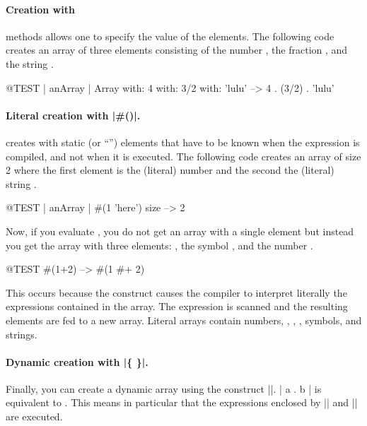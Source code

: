 \documentclass[a4paper,10pt,twoside]{book}
\begin{document}
\paragraph{Creation with }  methods allows one to specify the value of the elements.  
The following code creates an array of three elements consisting of the number , the fraction , and the string .

\begin{code}{@TEST | anArray |}
Array with: 4 with: 3/2 with: 'lulu' -->  {4 . (3/2) . 'lulu'}
\end{code}

\paragraph{Literal creation with \ct|\#()|.}
\ct{#()} creates  with static (or ``'') elements that have to be known when the expression is compiled, and not when it is executed.
The following code creates an array of size 2 where the first element is the (literal) number  and the second the (literal) string .


\begin{code}{@TEST | anArray |}
#(1 'here') size --> 2
\end{code}

Now, if you evaluate , you do not get an array with a single element  but instead you get the array  \ie with three elements: , the symbol \ct{#+}, and the number .

\begin{code}{@TEST}
#(1+2) -->  #(1 #+ 2)
\end{code}

\noindent
This occurs because the construct \ct{#()} causes the compiler to interpret literally the expressions contained in the array.
The expression is scanned and the resulting elements are fed to a new array.
Literal arrays contain numbers, , , , symbols, and strings.

\paragraph{Dynamic creation with \ct|\{ \}|.}
Finally, you can create a dynamic array using the construct \ct|{}|.
\ct|{ a . b }| is equivalent to .
This means in particular that the expressions enclosed by \ct|{| and \ct|}| are executed. 
\end{document}
